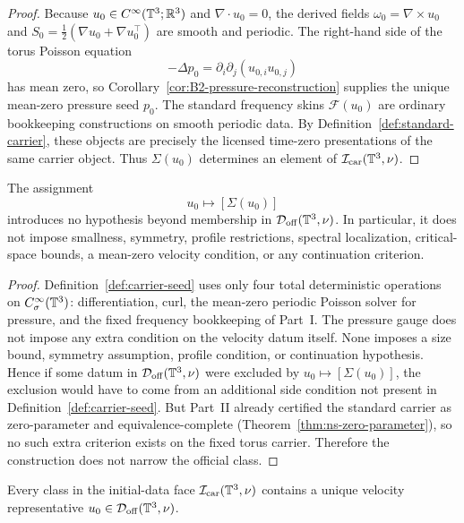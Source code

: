 \begin{proof}
Because $u_0\in C^\infty(\mathbb{T}^3;\mathbb{R}^3)$ and $\nabla\cdot u_0=0$, the derived fields
$\omega_0=\nabla\times u_0$ and $S_0=\tfrac12(\nabla u_0+\nabla u_0^\top)$ are smooth and periodic.
The right-hand side of the torus Poisson equation
\[
-\Delta p_0=\partial_i\partial_j(u_{0,i}u_{0,j})
\]
has mean zero, so Corollary~\ref{cor:B2-pressure-reconstruction} supplies the unique mean-zero pressure seed $p_0$. The standard frequency skins
$\mathcal F(u_0)$ are ordinary bookkeeping constructions on smooth periodic data. By
Definition~\ref{def:standard-carrier}, these objects are precisely the licensed time-zero
presentations of the same carrier object. Thus $\Sigma(u_0)$ determines an element of
$\mathcal I_{\mathrm{car}}(\mathbb{T}^3,\nu)$.
\end{proof}

\begin{proposition}\label{prop:no-hidden-prefilter}
The assignment
\[
u_0\longmapsto [\Sigma(u_0)]
\]
introduces no hypothesis beyond membership in $\mathcal D_{\mathrm{off}}(\mathbb{T}^3,\nu)$.
In particular, it does not impose smallness, symmetry, profile restrictions, spectral localization,
critical-space bounds, a mean-zero velocity condition, or any continuation criterion.
\end{proposition}

\begin{proof}
Definition~\ref{def:carrier-seed} uses only four total deterministic operations on
$C^\infty_\sigma(\mathbb{T}^3)$: differentiation, curl, the mean-zero periodic Poisson solver for pressure, and the fixed
frequency bookkeeping of Part~I. The pressure gauge does not impose any extra condition on the
velocity datum itself. None imposes a size bound, symmetry assumption, profile condition,
or continuation hypothesis. Hence if some datum in $\mathcal D_{\mathrm{off}}(\mathbb{T}^3,\nu)$ were excluded by
$u_0\mapsto [\Sigma(u_0)]$, the exclusion would have to come from an additional side condition not
present in Definition~\ref{def:carrier-seed}. But Part~II already certified the standard carrier as
zero-parameter and equivalence-complete (Theorem~\ref{thm:ns-zero-parameter}), so no such extra
criterion exists on the fixed torus carrier. Therefore the construction does not narrow the official
class.
\end{proof}

\begin{lemma}\label{lem:velocity-reconstruction}
Every class in the initial-data face $\mathcal I_{\mathrm{car}}(\mathbb{T}^3,\nu)$ contains a unique velocity
representative $u_0\in\mathcal D_{\mathrm{off}}(\mathbb{T}^3,\nu)$.
\end{lemma}

